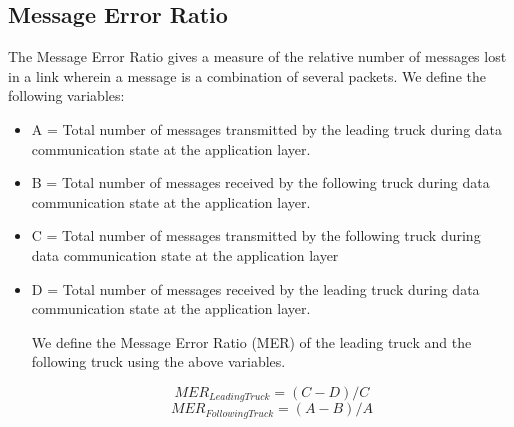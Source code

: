 \subsection{Message Error Ratio}
The Message Error Ratio gives a measure of the relative number of messages lost in a link wherein a message is a combination of several packets. We define the following variables:
\begin{itemize}
    \item A = Total number of messages transmitted by the leading truck during data communication state at the application layer.
    \item B = Total number of messages received by the following truck during data communication state at the application layer.
    \item C = Total number of messages transmitted by the following truck during data communication state at the application layer
    \item D = Total number of messages received by the leading truck during data communication state at the application layer.
    
    We define the Message Error Ratio (MER) of the leading truck and the following truck using the above variables.
    
    \begin{equation}
    MER_{LeadingTruck} = (C-D)/C
    \label{eq: MERLeadingTruck}
    \end{equation}
    \begin{equation}
    MER_{FollowingTruck} = (A-B)/A
    \label{eq: MERFollowingTruck}
    \end{equation}
    
\end{itemize}

